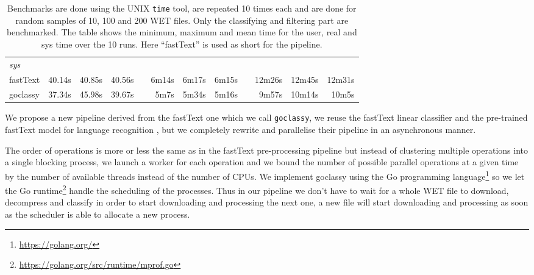 \begin{table*}[t!]
\begin{tabular}{lrrrcrrrcrrr}
        \emph{sys}                                                                                                                                                                                                                                                                             \\
        fastText & 40.14s                       & 40.85s                  & 40.56s                        &             & 6m14s                         & 6m17s                   & 6m15s                    &  & 12m26s                  & 12m45s                  & 12m31s                   \\
        goclassy & 37.34s                       & 45.98s                  & 39.67s                        &             & 5m7s                          & 5m34s                   & 5m16s                    &  & 9m57s                   & 10m14s                  & 10m5s                    \\
        \bottomrule
    \end{tabular}
    \caption{Benchmarks are done using the UNIX \texttt{time} tool, are repeated 10 times each and are done for random samples of 10, 100 and 200 WET files. Only the classifying and filtering part are benchmarked. The table shows the minimum, maximum and mean time for the user, real and sys time over the 10 runs. Here ``fastText'' is used as short for the pipeline.}
    \label{tab:Bench}
\end{table*}

We propose a new pipeline derived from the fastText one which we call \texttt{goclassy}, we reuse the fastText linear classifier \citep{joulin-etal-2016-fasttext, joulin-etal-2017-bag} and the pre-trained fastText model for language recognition \citep{grave-etal-2018-learning}, but we completely rewrite and parallelise their pipeline in an asynchronous manner.

The order of operations is more or less the same as in the fastText pre-processing pipeline but instead of clustering multiple operations into a single blocking process, we launch a worker for each operation and we bound the number of possible parallel operations at a given time by the number of available threads instead of the number of CPUs. We implement goclassy using the Go programming language\footnote{\url{https://golang.org/}} so we let the Go runtime\footnote{\url{https://golang.org/src/runtime/mprof.go}} handle the scheduling of the processes. Thus in our pipeline we don't have to wait for a whole WET file to download, decompress and classify in order to start downloading and processing the next one, a new file will start downloading and processing as soon as the scheduler is able to allocate a new process.

